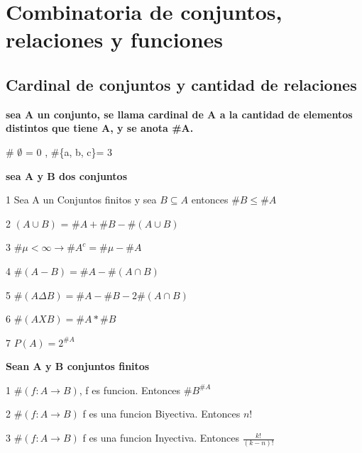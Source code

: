 \chapter{Combinatoria de conjuntos, relaciones y funciones}

\section{Cardinal de conjuntos y cantidad de relaciones}

\begin{definicion}[title=Definion de cardinal de un conjunto]
    \textbf{sea A un conjunto, se llama cardinal de A a la cantidad de elementos distintos que tiene A, y se anota \#A. }
\end{definicion}
\begin{ejemplo}
    \# $\emptyset$ = 0 , \#\{a, b, c\}= 3  
\end{ejemplo}

\begin{teoria}[title=Propiedades de los cardinales]
    \textbf{sea A y B dos conjuntos} 
    \begin{listapropiedades}
  \item[1] Sea A un Conjuntos finitos y sea $B \subseteq A $ entonces $\#B \leq \#A $
  \item[2] $(A\cup B)$ = $\#A + \#B - \#(A \cup B)$ 
  \item[3] $\#\mu < \infty \rightarrow \#A^c = \#\mu - \#A$ 
  \item[4] $\#(A-B) = \#A - \#(A\cap B) $
  \item[5] $\# (A\Delta B) = \#A - \#B -2\#(A\cap B)$ 
  \item[6] $\# (A X B) = \#A * \#B $
  \item[7] $P(A) = 2^{\#A}$
    \end{listapropiedades}
\end{teoria}

\begin{teoria}[title= Cantidad de Funcion]
    \textbf{Sean A y B conjuntos finitos}
        \begin{listapropiedades}
  \item[1] $\#(f: A\rightarrow B)$, f es funcion. Entonces $\#B^{\#A}$
  \item[2] $\#(f: A\rightarrow B)$ f es una funcion Biyectiva. Entonces $n!$
  \item[3] $\#(f: A\rightarrow B)$ f es una funcion Inyectiva. Entonces $\frac{k!}{(k-n)!}$
    \end{listapropiedades}
\end{teoria}


